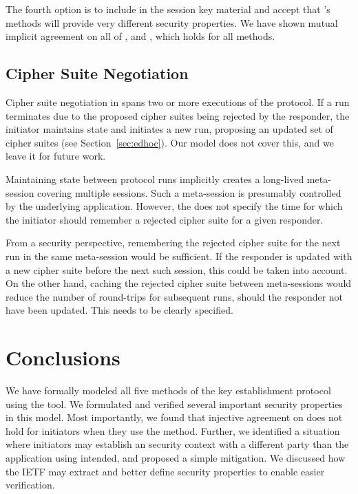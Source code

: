 \documentclass[runningheads, envcountsame, a4paper, draft, x11names]{llncs}
\newcommand{\spacehack}{\vspace{-1em}}
\newcommand{\fillhack}{\vspace{-0.5em}}
\begin{document}
The fourth option is to include \mGiy{} in the session key material and accept
that \mEdhoc{}'s methods will provide very different security properties.
%
We have shown mutual implicit agreement on all of \mGxy{}, \mGiy{} and \mGrx{},
which holds for all methods.
%

\spacehack
\subsection{Cipher Suite Negotiation}
\label{sec:ciphersuiteNegotiation}
\fillhack
{}
%
Cipher suite negotiation in \mEdhoc{} spans two or more executions of the
protocol.
%
If a run terminates due to the proposed cipher suites being rejected by the
responder, the initiator maintains state and initiates a new run, proposing
an updated set of cipher suites (see Section~\ref{sec:edhoc}).
%
Our model does not cover this, and we leave it for future work.

Maintaining state between protocol runs implicitly creates a long-lived
meta-session covering multiple \mEdhoc{} sessions.
%
Such a meta-session is presumably controlled by the underlying application.
%
However, the \mSpec{} does not specify the time for which the initiator should
remember a rejected cipher suite for a given responder.
%

From a security perspective, remembering the rejected cipher suite for the
next \mEdhoc{} run in the same meta-session would be sufficient.
%
If the responder is updated with a new cipher suite before the next such
session, this could be taken into account. On the other hand, caching the
rejected cipher suite between meta-sessions would reduce the number of
round-trips for subsequent runs, should the responder not have been updated.
%
This needs to be clearly specified. 

\spacehack
\section{Conclusions}
\label{sec:conclusions}
\fillhack
We have formally modeled all five
methods of the \mEdhoc{} key establishment protocol using the \mTamarin{} tool.
%
We formulated and verified several important security properties in this model. 
%
%
Most importantly, we found that injective agreement on \mGiy{} does not hold for
initiators when they use the \mStat{} method.
%
Further, we identified a situation where initiators may establish an \mOscore{}
security context with a different party than the application using \mEdhoc{}
intended, and proposed a simple mitigation.
%
We discussed how the IETF may extract and better define security properties to
enable easier verification.
%
\end{document}
